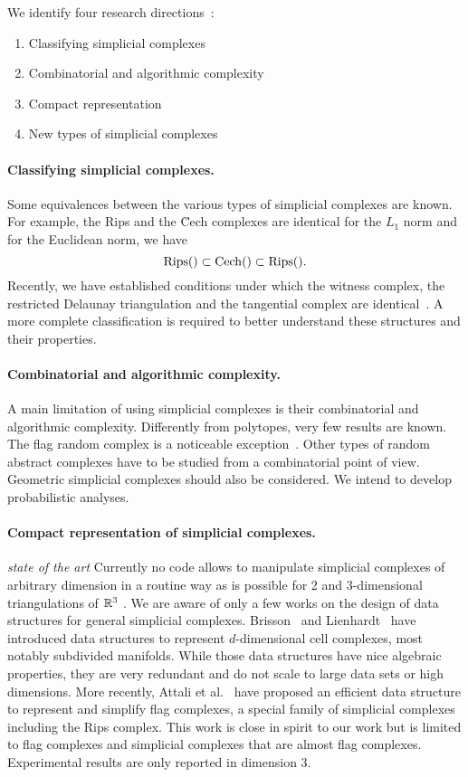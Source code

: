 We identify four research directions~:
\begin{enumerate}
\item Classifying simplicial complexes
\item Combinatorial and algorithmic complexity 
\item Compact representation
\item New types of simplicial complexes
\end{enumerate}

\paragraph{Classifying simplicial complexes.}
Some equivalences between the various types of simplicial complexes are known. For example,
the Rips and the \u{C}ech complexes are identical for the $L_1$ norm and for the Euclidean norm, we have 
\[ {\rm Rips} () \subset {\rm {C}ech} () \subset {\rm Rips} () .\]
Recently, we have established conditions under which the witness complex, the restricted Delaunay triangulation and the tangential complex are identical~\cite{}. A more complete classification is required to better understand these structures and their properties.

\paragraph{Combinatorial and algorithmic complexity.}
A main limitation of using simplicial complexes is their combinatorial and algorithmic complexity. 
Differently from polytopes, very few results are known. The flag random complex is a noticeable exception~\cite{}. Other types of random abstract complexes have to be studied from a combinatorial point of view. Geometric simplicial complexes should also be considered. We intend to develop probabilistic analyses.

\paragraph{Compact representation of simplicial complexes.}
{\em state of the art} Currently no code allows to manipulate simplicial
complexes of arbitrary dimension in a routine way as is possible for 2 and 3-dimensional
triangulations of $\mathbb R ^3$
\cite{springerflo,DBLP:journals/tog/PaoluzziBCF93,svy-crm-99}.
We are aware of only a few works on the design of data structures for
general simplicial complexes. Brisson~\cite{Brisson:1989:RGS:73833.73858} and Lienhardt~\cite{DBLP:journals/ijcga/Lienhardt94}
have introduced data structures to represent $d$-dimensional cell
complexes, most notably subdivided manifolds. While those data
structures have nice algebraic properties, they are very redundant and
do not scale to large data sets or high dimensions. More recently, Attali et
al.~\cite{Attali2011} have proposed an efficient data structure to represent and
simplify flag complexes, a special family of simplicial complexes
including the Rips complex. This work is close in spirit to our work but is
limited to flag complexes and simplicial complexes that are almost
flag complexes. Experimental results are only reported in dimension $3$.

